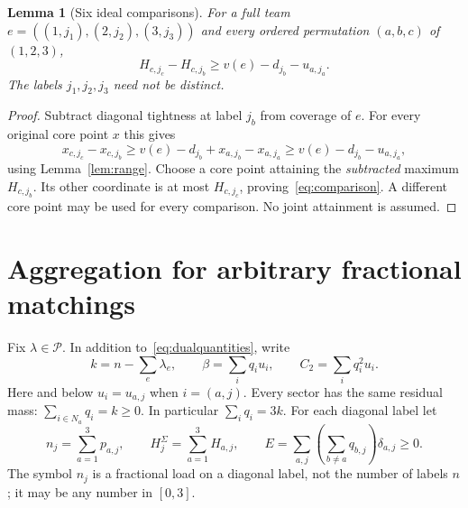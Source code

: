 \documentclass[11pt]{article}
\newtheorem{lemma}[theorem]{Lemma}
\theoremstyle{remark}
\newcommand{\pack}{\mathcal P}
\begin{document}
\begin{lemma}[Six ideal comparisons]\label{lem:comparison}
For a full team $e=((1,j_1),(2,j_2),(3,j_3))$ and every ordered
permutation $(a,b,c)$ of $(1,2,3)$,
\begin{equation}\label{eq:comparison}
         H_{c,j_c}-H_{c,j_b}\ge v(e)-d_{j_b}-u_{a,j_a}.
\end{equation}
The labels $j_1,j_2,j_3$ need not be distinct.
\end{lemma}
\begin{proof}
Subtract diagonal tightness at label $j_b$ from coverage of $e$.
For every original core point $x$ this gives
\[
 x_{c,j_c}-x_{c,j_b}
 \ge v(e)-d_{j_b}+x_{a,j_b}-x_{a,j_a}
 \ge v(e)-d_{j_b}-u_{a,j_a},
\]
using Lemma~\ref{lem:range}. Choose a core point attaining the
\emph{subtracted} maximum $H_{c,j_b}$. Its other coordinate is at most
$H_{c,j_c}$, proving~\eqref{eq:comparison}. A different core point may
be used for every comparison. No joint attainment is assumed.
\end{proof}

\section{Aggregation for arbitrary fractional matchings}\label{sec:aggregation}
Fix $\lambda\in\pack$. In addition to~\eqref{eq:dualquantities}, write
\begin{equation}\label{eq:residual}
 k=n-\sum_e\lambda_e,\qquad
 \beta=\sum_iq_iu_i,\qquad C_2=\sum_iq_i^2u_i.
\end{equation}
Here and below $u_i=u_{a,j}$ when $i=(a,j)$. Every sector has the same
residual mass: $\sum_{i\in N_a}q_i=k\ge0$. In particular $\sum_iq_i=3k$.
For each diagonal label let
\[
 n_j=\sum_{a=1}^3p_{a,j},\qquad H_j^\Sigma=\sum_{a=1}^3H_{a,j},\qquad
 E=\sum_{a,j}\left(\sum_{b\ne a}q_{b,j}\right)\delta_{a,j}\ge0.
\]
The symbol $n_j$ is a fractional load on a diagonal label, not the number
of labels $n$; it may be any number in $[0,3]$.
\end{document}
